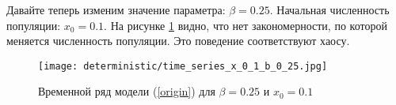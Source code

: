     Давайте теперь изменим значение параметра: \(\beta = 0.25\). Начальная численность популяции: \(x_0 = 0.1\). На рисунке \ref{time_series_x_0_1_b_0_25} видно, что нет закономерности, по которой меняется численность популяции. Это поведение соответствуют хаосу.
    
    \begin{figure}
        \centering
        \texttt{[image: deterministic/time\_series\_x\_0\_1\_b\_0\_25.jpg]}

        \captionsetup{justification=centering}
        \caption{Временной ряд модели (\ref{origin}) для \(\beta = 0.25\) и \(x_0 = 0.1\)}
        \label{time_series_x_0_1_b_0_25}
    \end{figure}
